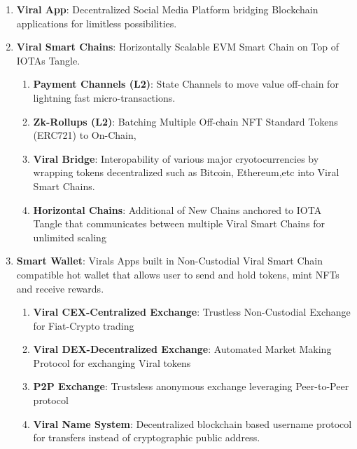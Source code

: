 \documentclass[10pt]{article}
\begin{document}
\begin{enumerate}

\item \textbf{Viral App}: Decentralized Social Media Platform bridging Blockchain applications for limitless possibilities.

\item \textbf{Viral Smart Chains}: Horizontally Scalable EVM Smart Chain on Top of IOTA\textsc{}s Tangle.

\begin{enumerate}

	\item \textbf{Payment Channels (L2)}: State Channels to move value off-chain for lightning fast micro-transactions.

	\item \textbf{Zk-Rollups (L2)}: Batching Multiple Off-chain NFT Standard Tokens (ERC721) to On-Chain,
	\item \textbf{Viral Bridge}: Interopability of various major cryotocurrencies by wrapping tokens decentralized such as Bitcoin, Ethereum,etc into Viral Smart Chains.
	\item \textbf{Horizontal Chains}: Additional of New Chains anchored to IOTA Tangle that communicates between multiple Viral Smart Chains for unlimited scaling

\end{enumerate}

\item \textbf{Smart Wallet}: Viral\textsc{}s App\textsc{}s built in Non-Custodial Viral Smart Chain compatible hot wallet that allows user to send and hold tokens, mint NFTs and receive rewards.

\begin{enumerate}

\item \textbf{Viral CEX-Centralized Exchange}: Trustless Non-Custodial Exchange for Fiat-Crypto trading
\item \textbf{Viral DEX-Decentralized Exchange}: Automated Market Making Protocol for exchanging Viral tokens
\item \textbf{P2P Exchange}: Trustsless anonymous exchange leveraging Peer-to-Peer protocol
\item \textbf{Viral Name System}: Decentralized blockchain based username protocol for transfers instead of cryptographic public address.

\end{enumerate}


\end{enumerate}
\end{document}
